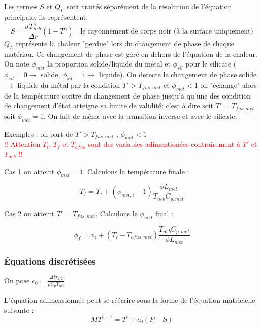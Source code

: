 \documentclass[10pt,a4paper]{article}
\numberwithin{equation}{section}
\begin{document}
Les termes $S$ et $Q_L$ sont traités séparément de la résolution de l'équation principale, ils représentent: 
\begin{equation}
 S =\frac{\sigma T_{neb}^4}{\Delta r}( 1 - T^4)  \quad \textrm{le rayonnement de corps noir (à la surface uniquement)}
\end{equation}
$Q_L$ représente la chaleur "perdue" lors du changement de phase de chaque matériau. Ce changement de phase est géré en dehors de l'équation de la chaleur. On note $\phi_{met}$ la proportion solide/liquide du métal et $\phi_{sil}$ pour le silicate ($\phi_{sil} = 0 \rightarrow$ solide, $\phi_{sil} = 1 \rightarrow$ liquide). On detecte le changement de phase solide $\rightarrow$ liquide du métal par la condition  $T' > T_{fus,met} $ et $ \phi_{met} < 1$ on "échange" alors de la température contre du changement de phase jusqu'à qu'une des condition de changement d'état atteigne sa limite de validité: c'est à dire soit $T' = T_{fus,met}$ soit $\phi_{met} = 1$. On fait de même avec la transition inverse et avec le silicate.

Exemples : on part de $T' > T_{fus,met}$ , $ \phi_{met} < 1$  \\
\textcolor{red}{!! Attention $T_i$, $T_f$ et $T_{afus}$ sont des variables adimentionées contrairement à $T'$ et $T_{neb}$ !!}


Cas 1 on atteint $\phi_{met} = 1$. Calculons la température finale : 

\begin{equation}
T_{f} =  T_{i} +  (\phi_{met,i} - 1 ) \frac{\phi L_{met}}{T_{neb} C_{p,met} }
\end{equation}

Cas 2 on atteint $T' = T_{fus,met}$. Calculons le $\phi_{met}$ final : 

\begin{equation}
\phi_{f} =  \phi_{i} +  (T_{i}-T_{afus,met}) \frac{T_{neb} C_{p,met}}{\phi L_{met}}
\end{equation}

\subsubsection{Équations discrétisées}

On pose $c_0 = \frac{\Delta t \tau_{1/2} }{\rho C_p T_{neb}}$ 

L'équation adimensionnée peut se réécrire sous la forme de l'équation matricielle suivante :
\begin{equation}
MT^{t+1} = T^t + c_0 ( P + S )
\end{equation}
\end{document}
